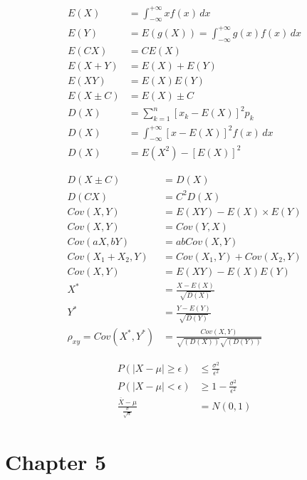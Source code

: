 \documentclass[12pt]{article}
\begin{document}
\begin{align}
    E(X) &= \int_{-\infty}^{+\infty} xf(x) \,dx \\
    E(Y) &= E(g(X)) = \int_{-\infty}^{+\infty} g(x)f(x) \,dx \\
    E(CX) &= CE(X)\\
    E(X+Y) &= E(X) +E(Y)\\
    E(XY) &= E(X) E(Y)\\
    E(X\pm C) &= E(X) \pm C\\
    D(X) &= \sum_{k = 1}^{n}  [x_k -E(X)]^2 p_k\\
    D(X) &= \int_{-\infty}^{+\infty} [x-E(X)]^2f(x) \,dx \\ 
    D(X) &= E(X^2) -[E(X)]^2
\end{align}
  

\begin{align}
    D(X\pm C) &= D(X) \\
    D(CX) &= C^2D(X)\\
    Cov(X,Y)&=E(XY)-E(X)\times E(Y) \\
    Cov(X,Y) &= Cov(Y,X) \\
    Cov(aX,bY) &= abCov(X,Y) \\
    Cov(X_1+X_2,Y) &= Cov(X_1,Y) + Cov(X_2,Y) \\
    Cov(X,Y) &= E(XY) -E(X)E(Y) \\
    X^* &= \frac{X-E(X)}{\sqrt{D(X)}}\\
    Y^* &= \frac{Y-E(Y)}{\sqrt{D(Y)}}\\
        \rho_{xy} = Cov(X^*,Y^*) &= \frac{Cov(X,Y)}{\sqrt{(D(X))} \sqrt{(D(Y))}} 
\end{align}

\begin{align}
    P(|X - \mu| \geq \epsilon) &\leq \frac{\sigma^2}{\epsilon^2} \\
    P(|X - \mu| < \epsilon) & \geq 1-\frac{\sigma^2}{\epsilon^2} \\
    \frac{\bar{X}-\mu}{\frac{\sigma}{\sqrt{n}}} &= N(0,1)
\end{align}

\section{Chapter 5}
\end{document}

